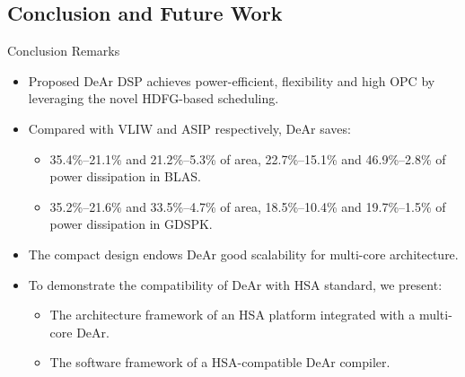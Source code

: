 \documentclass{beamer}
\begin{document}
\begin{CJK}{UTF8}{bkai}
            \section{Conclusion and Future Work}
            \begin{frame}{Conclusion Remarks}
                \begin{itemize}
                    \item <2->{Proposed DeAr DSP achieves power-efficient, flexibility and high OPC by leveraging the novel HDFG-based scheduling.}
                    \item <3->{Compared with VLIW and ASIP respectively, DeAr saves:
                            \begin{itemize}
                                \item 35.4\%--21.1\% and 21.2\%--5.3\% of area, 22.7\%--15.1\% and 46.9\%--2.8\% of power dissipation in BLAS.
                                \item 35.2\%--21.6\% and 33.5\%--4.7\% of area, 18.5\%--10.4\% and 19.7\%--1.5\% of power dissipation in GDSPK.
                            \end{itemize}
                        }
                    \item <4->{The compact design endows DeAr good scalability for multi-core architecture.}
                    \item <5->{To demonstrate the compatibility of DeAr with HSA standard, we present:
                            \begin{itemize}
                                \item The architecture framework of an HSA platform integrated with a multi-core DeAr.
                                \item The software framework of a HSA-compatible DeAr compiler.
                            \end{itemize}
                        }
                \end{itemize}
            \end{frame}


\end{CJK}
\end{document}
